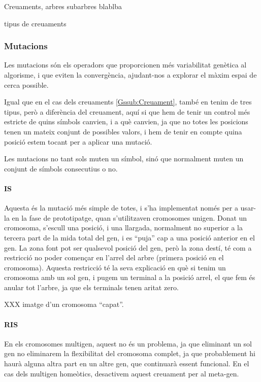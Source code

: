 Creuaments, arbres subarbres blablba

tipus de creuaments

\subsubsection{Mutacions} %
\label{Gssub:Mutacions}

Les mutacions són els operadors que proporcionen més variabilitat genètica al
algorisme, i que eviten la convergència, ajudant-nos a explorar el màxim espai
de cerca possible.

Igual que en el cas dels creuaments \ref{Gssub:Creuament}, també en tenim de
tres tipus, però a diferència del creuament, aquí si que hem de tenir un control
més estricte de quins símbols canvien, i a què canvien, ja que no totes les
posicions tenen un mateix conjunt de possibles valors, i hem de tenir en compte
quina posició estem tocant per a aplicar una mutació.

Les mutacions no tant sols muten un símbol, sinó que normalment muten un
conjunt de símbols consecutius o no.

\paragraph{IS} %
\label{par:IS}
Aquesta és la mutació més simple de totes, i s'ha implementat només per a
usar-la en la fase de prototipatge, quan s'utilitzaven cromosomes unigen.  Donat
un cromosoma, s'escull una posició, i una llargada, normalment no superior a la
tercera part de la mida total del gen, i es ``puja'' cap a una posició anterior
en el gen.  La zona font pot ser qualsevol posició del gen, però la zona destí,
té com a restricció no poder començar en l'arrel del arbre (primera posició en
el cromosoma).  Aquesta restricció té la seva explicació en què si tenim un
cromosoma amb un sol gen, i pugem un terminal a la posició arrel, el que fem és
anular tot l'arbre, ja que els terminals tenen aritat zero.

XXX imatge d'un cromosoma ``capat''.

\paragraph{RIS} %
\label{par:RIS}
En els cromosomes multigen, aquest no és un problema, ja que eliminant un sol
gen no eliminarem la flexibilitat del cromosoma complet, ja que probablement hi
haurà alguna altra part en un altre gen, que continuarà essent funcional.  En el
cas dels multigen homeòtics, desactivem aquest creuament per al meta-gen.

